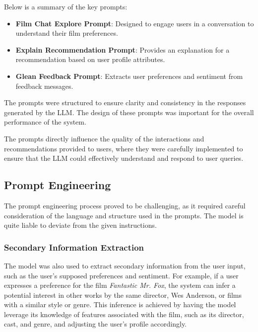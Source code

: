 Below is a summary of the key prompts:
\begin{itemize}
    \item \textbf{Film Chat Explore Prompt}: Designed to engage users in a conversation to understand their film preferences.
    \item \textbf{Explain Recommendation Prompt}: Provides an explanation for a recommendation based on user profile attributes.
    \item \textbf{Glean Feedback Prompt}: Extracts user preferences and sentiment from feedback messages.
\end{itemize}
The prompts were structured to ensure clarity and consistency in the responses generated by the LLM. The design of these prompts was important for the overall performance of the system.

The prompts directly influence the quality of the interactions and recommendations provided to users, where they were carefully implemented to ensure that the LLM could effectively understand and respond to user queries.


\subsection{Prompt Engineering}
\label{subsec:prompt_engineering}
The prompt engineering process proved to be challenging, as it required careful consideration of the language and structure used in the prompts.
The model is quite liable to deviate from the given instructions. 

\subsubsection{Secondary Information Extraction}
The model was also used to extract secondary information from the user input, such as the user's supposed preferences and sentiment.
For example, if a user expresses a preference for the film \textit{Fantastic Mr. Fox}, the system can infer a potential interest in other works by the same director, Wes Anderson, or films with a similar style or genre. 
This inference is achieved by having the model leverage its knowledge of features associated with the film, such as its director, cast, and genre, and adjusting the user's profile accordingly.

